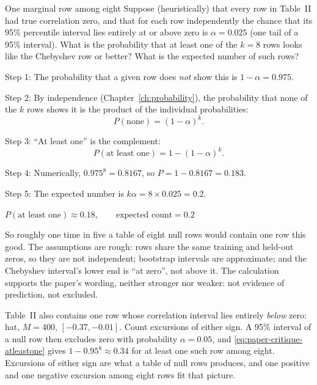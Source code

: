 \begin{sample}{One marginal row among eight}
Suppose (heuristically) that every row in Table~II had true correlation zero, and that for each row independently the chance that its 95\% percentile interval lies entirely at or above zero is $\alpha=0.025$ (one tail of a 95\% interval). What is the probability that at least one of the $k=8$ rows looks like the Chebyshev row or better? What is the expected number of such rows?

Step 1: The probability that a given row does \emph{not} show this is $1-\alpha=0.975$.

Step 2: By independence (Chapter~\ref{ch:probability}), the probability that none of the $k$ rows shows it is the product of the individual probabilities:
\begin{equation}
P(\text{none})=(1-\alpha)^k .
\label{eq:paper-critique-none}
\end{equation}

Step 3: ``At least one'' is the complement:
\begin{equation}
P(\text{at least one})=1-(1-\alpha)^k .
\label{eq:paper-critique-atleastone}
\end{equation}

Step 4: Numerically, $0.975^8=0.8167$, so $P=1-0.8167=0.183$.

Step 5: The expected number is $k\alpha=8\times0.025=0.2$.

$\boxed{P(\text{at least one})\approx0.18,\qquad \text{expected count}=0.2}$

So roughly one time in five a table of eight null rows would contain one row this good. The assumptions are rough: rows share the same training and held-out zeros, so they are not independent; bootstrap intervals are approximate; and the Chebyshev interval's lower end is ``at zero'', not above it. The calculation supports the paper's wording, neither stronger nor weaker: not evidence of prediction, not excluded.
\end{sample}

Table~II also contains one row whose correlation interval lies entirely \emph{below} zero: hat, $M=400$, $[-0.37,-0.01]$. Count excursions of either sign. A 95\% interval of a null row then excludes zero with probability $\alpha=0.05$, and \eqref{eq:paper-critique-atleastone} gives $1-0.95^8\approx0.34$ for at least one such row among eight. Excursions of either sign are what a table of null rows produces, and one positive and one negative excursion among eight rows fit that picture.


